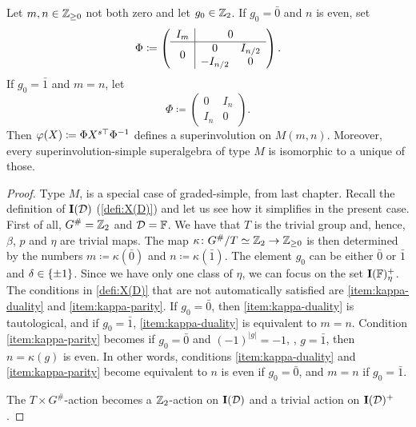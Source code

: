 \begin{prop}\label{prop:iso-M-with-vphi}
    Let $m,n \in \mathbb{Z}_{\geq 0}$ not both zero and let $g_0 \in \mathbb{Z}_2$. 
    If $g_0 = \bar 0$ and $n$ is even, set 
    \[
        \sbox0{$\begin{matrix} 0& I_{n/2}\\ -I_{n/2}& 0\end{matrix}$}
        \Phi \coloneqq \left(\begin{array}{c|c}
                    I_m & 0\\
                    \hline
                    0 & \usebox{0}
                \end{array}\right).
    \]
    If $g_0 = \bar 1$ and $m = n$, let
    \[
        \Phi \coloneqq \left(\begin{array}{c|c}
                    0 & I_n\\
                    \hline 
                    I_n & 0
                \end{array}\right).
    \]
    Then $\varphi(X) \coloneqq \Phi X^{s\top} \Phi^{-1}$ defines a superinvolution on $M(m,n)$. 
    Moreover, every su\-per\-in\-vo\-lu\-tion-sim\-ple superalgebra of type $M$ is isomorphic to a unique of those.
\end{prop}

\begin{proof}
    Type $M$, is a special case of graded-simple, from last chapter. 
    Recall the definition of $\mathbf{I}(\mathcal{D})$ (\cref{defi:X(D)}) and let us see how it simplifies in the present case. 
    First of all, $G^\# = \mathbb{Z}_2$ and $\mathcal{D} = \mathbb{F}$. 
    We have that $T$ is the trivial group and, hence, $\beta$, $p$ and $\eta$ are trivial maps. 
    The map $\kappa\colon G^\#/T \simeq \mathbb{Z}_2 \to \mathbb{Z}_{\geq 0}$ is then determined by the numbers $m \coloneqq \kappa(\bar 0)$ and $n \coloneqq \kappa(\bar 1)$. 
    The element $g_0$ can be either $\bar 0$ or $\bar 1$ and $\delta \in \{ \pm 1 \}$. 
    Since we have only one class of $\eta$, we can focus on the set $\mathbf{I}(\mathbb{F})_\eta^+$. 
    The conditions in \cref{defi:X(D)} that are not automatically satisfied are \eqref{item:kappa-duality} and \eqref{item:kappa-parity}. 
    If $g_0 = \bar 0$, then \eqref{item:kappa-duality} is tautological, and if $g_0 = \bar 1$, \eqref{item:kappa-duality} is equivalent to $m=n$. 
    Condition \eqref{item:kappa-parity} becomes if $g_0 = \bar 0$ and $(-1)^{|g|}= -1$, \ie, $g = \bar 1$, then $n = \kappa (g)$ is even.
    In other words, conditions \eqref{item:kappa-duality} and \eqref{item:kappa-parity} become equivalent to $n$ is even if $g_0 = \bar 0$, and $m = n$ if $g_0= \bar 1$. 

    The $T\times G^\#$-action becomes a $\mathbb{Z}_2$-action on $\mathbf{I}(\mathcal{D})$ and a trivial action on $\mathbf{I}(\mathcal{D})^+$.
\end{proof}

